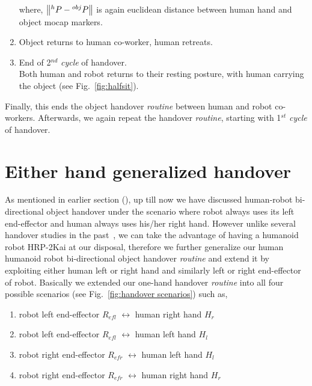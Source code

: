 \begin{enumerate}[start=0,label={\bf{t}\arabic*:}]
    where, $\norm{{}^h{P} - {}^{obj}{P}}$ is again euclidean distance between human hand and object mocap markers.

    \item Object returns to human co-worker, human retreats.
    
    \item End of 2$^{nd}$ \textit{cycle} of handover.\\
    Both human and robot returns to their resting posture, with human carrying the object (see Fig.~\ref{fig:halfsit}).
    
\end{enumerate}

Finally, this ends the object handover \textit{routine} between human and robot co-workers. Afterwards, we again repeat the handover \textit{routine}, starting with 1$^{st}$ \textit{cycle} of handover.


\clearpage

\section{Either hand generalized handover}\label{both hands individual}

As mentioned in earlier section (), up till now we have discussed human-robot bi-directional object handover under the scenario where robot always uses its left end-effector and human always uses his/her right hand. However unlike several handover studies in the past~\cite{cakmak2011human, medina2016human, huber2008Indus, kupcsik2016learning}, we can take the advantage of having a humanoid robot HRP-2Kai at our disposal, therefore we further generalize our human humanoid robot bi-directional object handover \textit{routine} and extend it by exploiting either human left or right hand and similarly left or right end-effector of robot. Basically we extended our one-hand handover \textit{routine} into all four possible scenarios (see Fig.~\ref{fig:handover scenarios}) such as,

\begin{enumerate}
	\item robot left end-effector $R_{efl}$ $\longleftrightarrow$ human right hand $H_r$
	\item robot left end-effector $R_{efl}$ $\longleftrightarrow$ human left hand $H_l$
	\item robot right end-effector $R_{efr}$ $\longleftrightarrow$ human left hand $H_l$
	\item robot right end-effector $R_{efr}$ $\longleftrightarrow$ human right hand $H_r$
\end{enumerate}


